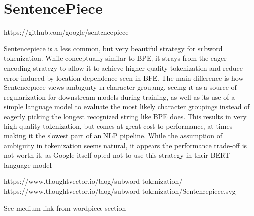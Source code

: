 \section{SentencePiece}

https://github.com/google/sentencepiece

Sentencepiece is a less common, but very beautiful strategy for subword tokenization. While conceptually similar to BPE, it strays from the eager encoding strategy to allow it to achieve higher quality tokenization and reduce error induced by location-dependence seen in BPE. The main difference is how Sentencepiece views ambiguity in character grouping, seeing it as a source of regularization for downstream models during training, as well as its use of a simple language model to evaluate the most likely character groupings instead of eagerly picking the longest recognized string like BPE does. This results in very high quality tokenization, but comes at great cost to performance, at times making it the slowest part of an NLP pipeline. While the assumption of ambiguity in tokenization seems natural, it appears the performance trade-off is not worth it, as Google itself opted not to use this strategy in their BERT language model.

https://www.thoughtvector.io/blog/subword-tokenization/
https://www.thoughtvector.io/blog/subword-tokenization/Sentencepiece.svg

See medium link from wordpiece section

